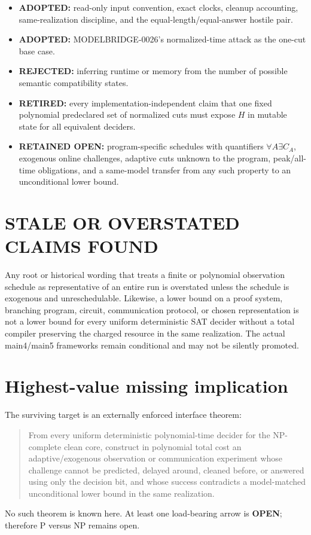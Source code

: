 \documentclass[11pt]{article}
\newcommand{\OPEN}{\textbf{OPEN}}
\begin{document}
\begin{itemize}
\item \textbf{ADOPTED:} read-only input convention, exact clocks, cleanup accounting,
same-realization discipline, and the equal-length/equal-answer hostile pair.
\item \textbf{ADOPTED:} MODELBRIDGE-0026's normalized-time attack as the one-cut base case.
\item \textbf{REJECTED:} inferring runtime or memory from the number of possible semantic
compatibility states.
\item \textbf{RETIRED:} every implementation-independent claim that one fixed polynomial
predeclared set of normalized cuts must expose $H$ in mutable state for all equivalent
deciders.
\item \textbf{RETAINED OPEN:} program-specific schedules with quantifiers
$\forall A\exists C_A$, exogenous online challenges, adaptive cuts unknown to the program,
peak/all-time obligations, and a same-model transfer from any such property to an
unconditional lower bound.
\end{itemize}

\section{STALE OR OVERSTATED CLAIMS FOUND}

Any root or historical wording that treats a finite or polynomial observation schedule as
representative of an entire run is overstated unless the schedule is exogenous and
unreschedulable.  Likewise, a lower bound on a proof system, branching program, circuit,
communication protocol, or chosen representation is not a lower bound for every uniform
deterministic SAT decider without a total compiler preserving the charged resource in the
same realization.  The actual main4/main5 frameworks remain conditional and may not be
silently promoted.

\section{Highest-value missing implication}

The surviving target is an externally enforced interface theorem:
\begin{quote}
From every uniform deterministic polynomial-time decider for the NP-complete clean core,
construct in polynomial total cost an adaptive/exogenous observation or communication
experiment whose challenge cannot be predicted, delayed around, cleaned before, or
answered using only the decision bit, and whose success contradicts a model-matched
unconditional lower bound in the same realization.
\end{quote}
No such theorem is known here.  At least one load-bearing arrow is \OPEN; therefore P
versus NP remains open.
\end{document}
